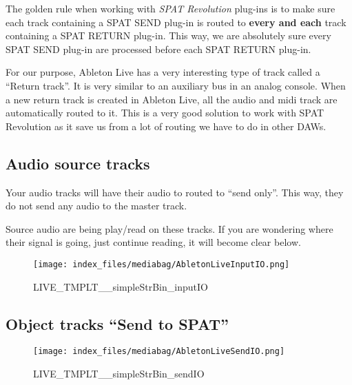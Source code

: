 \documentclass[
  letterpaper,
  DIV=11,
  numbers=noendperiod]{scrreport}
\begin{document}
The golden rule when working with \emph{SPAT Revolution} plug-ins is to
make sure each track containing a SPAT SEND plug-in is routed to
\textbf{every and each} track containing a SPAT RETURN plug-in. This
way, we are absolutely sure every SPAT SEND plug-in are processed before
each SPAT RETURN plug-in.

For our purpose, Ableton Live has a very interesting type of track
called a ``Return track''. It is very similar to an auxiliary bus in an
analog console. When a new return track is created in Ableton Live, all
the audio and midi track are automatically routed to it. This is a very
good solution to work with SPAT Revolution as it save us from a lot of
routing we have to do in other DAWs.

\hypertarget{audio-source-tracks}{%
\subsection{Audio source tracks}\label{audio-source-tracks}}

Your audio tracks will have their audio to routed to ``send only''. This
way, they do not send any audio to the master track.

Source audio are being play/read on these tracks. If you are wondering
where their signal is going, just continue reading, it will become clear
below.

\begin{figure}

{\centering \texttt{[image: index\_files/mediabag/AbletonLiveInputIO.png]}

}

\caption{LIVE\_TMPLT\_\_simpleStrBin\_inputIO}

\end{figure}

\hypertarget{object-tracks-send-to-spat}{%
\subsection{Object tracks ``Send to
SPAT''}\label{object-tracks-send-to-spat}}

\begin{figure}

{\centering \texttt{[image: index\_files/mediabag/AbletonLiveSendIO.png]}

}

\caption{LIVE\_TMPLT\_\_simpleStrBin\_sendIO}

\end{figure}
\end{document}
